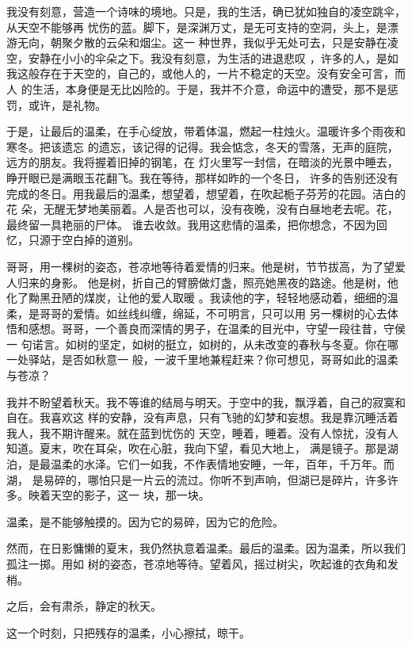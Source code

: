 \documentclass[12pt,a4paper]{article}
\def\blankrev{\vspace{1ex}}									%
\begin{document}
		我没有刻意，营造一个诗味的境地。只是，我的生活，确已犹如独自的凌空跳伞，从天空不能够再
	忧伤的蓝。脚下，是深渊万丈，是无可支持的空洞，头上，是漂游无向，朝聚夕散的云朵和烟尘。这一
	种世界，我似乎无处可去，只是安静在凌空，安静在小小的伞朵之下。我没有刻意，为生活的进退悲叹
	，许多的人，是如我这般存在于天空的，自己的，或他人的，一片不稳定的天空。没有安全可言，而人
	的生活，本身便是无比凶险的。于是，我并不介意，命运中的遭受，那不是惩罚，或许，是礼物。

		于是，让最后的温柔，在手心绽放，带着体温，燃起一柱烛火。温暖许多个雨夜和寒冬。把该遗忘
	的遗忘，该记得的记得。我会惦念，冬天的雪落，无声的庭院，远方的朋友。我将握着旧掉的钢笔，在
	灯火里写一封信，在暗淡的光景中睡去，睁开眼已是满眼玉花翻飞。我在等待，那样如昨的一个冬日，
	许多的告别还没有完成的冬日。用我最后的温柔，想望着，想望着，在吹起栀子芬芳的花园。洁白的花
	朵，无醒无梦地美丽着。人是否也可以，没有夜晚，没有白昼地老去呢。花，最终留一具艳丽的尸体。
	谁去收敛。我用这悲情的温柔，把你想念，不因为回忆，只源于空白掉的道别。

		哥哥，用一棵树的姿态，苍凉地等待着爱情的归来。他是树，节节拔高，为了望爱人归来的身影。
	他是树，折自己的臂膀做灯盏，照亮她黑夜的路途。他是树，他化了黝黑丑陋的煤炭，让他的爱人取暖
	。我读他的字，轻轻地感动着，细细的温柔，是哥哥的爱情。如丝线纠缠，绵延，不可明言，只可以用
	另一棵树的心去体悟和感想。哥哥，一个善良而深情的男子，在温柔的目光中，守望一段往昔，守侯一
	句诺言。如树的坚定，如树的挺立，如树的，从未改变的春秋与冬夏。你在哪一处驿站，是否如秋意一
	般，一波千里地兼程赶来？你可想见，哥哥如此的温柔与苍凉？

		我并不盼望着秋天。我不等谁的结局与明天。于空中的我，飘浮着，自己的寂寞和自在。我喜欢这
	样的安静，没有声息，只有飞驰的幻梦和妄想。我是靠沉睡活着我人，我不期许醒来。就在蓝到忧伤的
	天空，睡着，睡着。没有人惊扰，没有人知道。夏末，吹在耳朵，吹在心脏，我向下望，看见大地上，
	满是镜子。那是湖泊，是最温柔的水泽。它们一如我，不作表情地安睡，一年，百年，千万年。而湖，
	是易碎的，哪怕只是一片云的流过。你听不到声响，但湖已是碎片，许多许多。映着天空的影子，这一
	块，那一块。


		\blankrev
		温柔，是不能够触摸的。因为它的易碎，因为它的危险。

		然而，在日影慵懒的夏末，我仍然执意着温柔。最后的温柔。因为温柔，所以我们孤注一掷。用如
	树的姿态，苍凉地等待。望着风，摇过树尖，吹起谁的衣角和发梢。

		\blankrev
		之后，会有肃杀，静定的秋天。

		这一个时刻，只把残存的温柔，小心擦拭，晾干。
\end{document}
